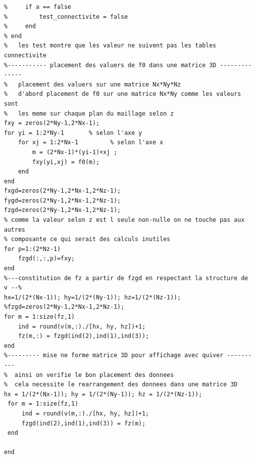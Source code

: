\documentclass[a4paper,12pt,titlepage]{report}
\begin{document}
\begin{onehalfspace}
\begin{appendix}
\begin{verbatim}
%     if a == false
%         test_connectivite = false
%     end
% end
%   les test montre que les valeur ne suivent pas les tables connectivite
%----------- placement des valuers de f0 dans une matrice 3D --------------
%   placement des valuers sur une matrice Nx*Ny*Nz
%   d'abord placement de f0 sur une matrice Nx*Ny comme les valeurs sont
%   les meme sur chaque plan du maillage selon z
fxy = zeros(2*Ny-1,2*Nx-1);
for yi = 1:2*Ny-1       % selon l'axe y
    for xj = 1:2*Nx-1         % selon l'axe x
        m = (2*Nx-1)*(yi-1)+xj ;
        fxy(yi,xj) = f0(m);
    end
end
fxgd=zeros(2*Ny-1,2*Nx-1,2*Nz-1);
fygd=zeros(2*Ny-1,2*Nx-1,2*Nz-1);
fzgd=zeros(2*Ny-1,2*Nx-1,2*Nz-1);
% comme la valeur selon z est l seule non-nulle on ne touche pas aux autres
% composante ce qui serait des calculs inutiles
for p=1:(2*Nz-1)
    fzgd(:,:,p)=fxy;
end
%---constitution de fz a partir de fzgd en respectant la structure de v --%
hx=1/(2*(Nx-1)); hy=1/(2*(Ny-1)); hz=1/(2*(Nz-1));
%fzgd=zeros(2*Ny-1,2*Nx-1,2*Nz-1);
for m = 1:size(fz,1)
    ind = round(v(m,:)./[hx, hy, hz])+1;
    fz(m,:) = fzgd(ind(2),ind(1),ind(3));
end
%--------- mise ne forme matrice 3D pour affichage avec quiver ----------
%  ainsi on verifie le bon placement des donnees
%  cela necessite le rearrangement des donnees dans une matrice 3D
hx = 1/(2*(Nx-1)); hy = 1/(2*(Ny-1)); hz = 1/(2*(Nz-1));
 for m = 1:size(fz,1)
     ind = round(v(m,:)./[hx, hy, hz])+1;
     fzgd(ind(2),ind(1),ind(3)) = fz(m);
 end

end
\end{verbatim}



\end{appendix}
\end{onehalfspace}
\end{document}
